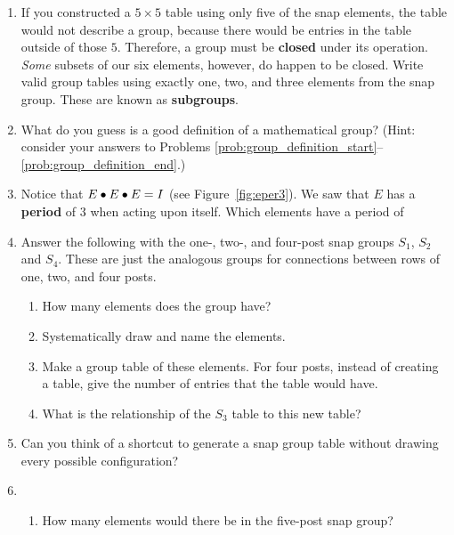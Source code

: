 \documentclass[../textbook.tex]{subfiles}
\begin{document}
\begin{enumerate}
\setcounter{enumi}{\value{some_name}}
\item If you constructed a $5\times 5$ table using only five of the snap elements, the table would not describe a group, because there would be entries in the table outside of those $5$. Therefore, a group must be \textbf{closed} under its operation. \textit{Some} subsets of our six elements, however, do happen to be closed. Write valid group tables using exactly one, two, and three elements from the snap group. These are known as \textbf{subgroups}.\label{prob:group_definition_end}
\item What do you guess is a good definition of a mathematical group? (Hint: consider your answers to Problems \ref{prob:group_definition_start}--\ref{prob:group_definition_end}.)
\item Notice that $E\bullet E\bullet E=I$ (see Figure~\ref{fig:eper3}). We saw that $E$ has a \textbf{period} of $3$ when acting upon itself. Which elements have a period of
\begin{enumerate}
\end{enumerate}
\item Answer the following with the one-, two-, and four-post snap groups $S_1$, $S_2$ and $S_4$. These are just the analogous groups for connections between rows of one, two, and four posts. \begin{enumerate}
\item How many elements does the group have?
\item Systematically draw and name the elements.
\item Make a group table of these elements. For four posts, instead of creating a table, give the number of entries that the table would have.
\item What is the relationship of the $S_3$ table to this new table?
\end{enumerate}
\item Can you think of a shortcut to generate a snap group table without drawing every possible configuration?
\item \begin{enumerate}
\item How many elements would there be in the five-post snap group? \label{prob:five_post_snap_list_start}

\end{enumerate}
\end{enumerate}
\end{document}
